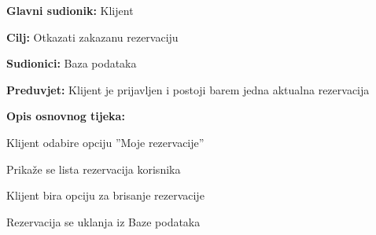 \noindent {}
\begin{packed_item}
	
	\item \textbf{Glavni sudionik: }Klijent
	\item  \textbf{Cilj:} Otkazati zakazanu rezervaciju
	\item  \textbf{Sudionici:} Baza podataka
	\item  \textbf{Preduvjet:} Klijent je prijavljen i postoji barem jedna aktualna rezervacija
	\item  \textbf{Opis osnovnog tijeka:}
	
	\item[] \begin{packed_enum}
		
		\item Klijent odabire opciju ”Moje rezervacije”
		\item Prikaže se lista rezervacija korisnika
		\item Klijent bira opciju za brisanje rezervacije
		\item Rezervacija se uklanja iz Baze podataka
		
	\end{packed_enum}
\end{packed_item}

